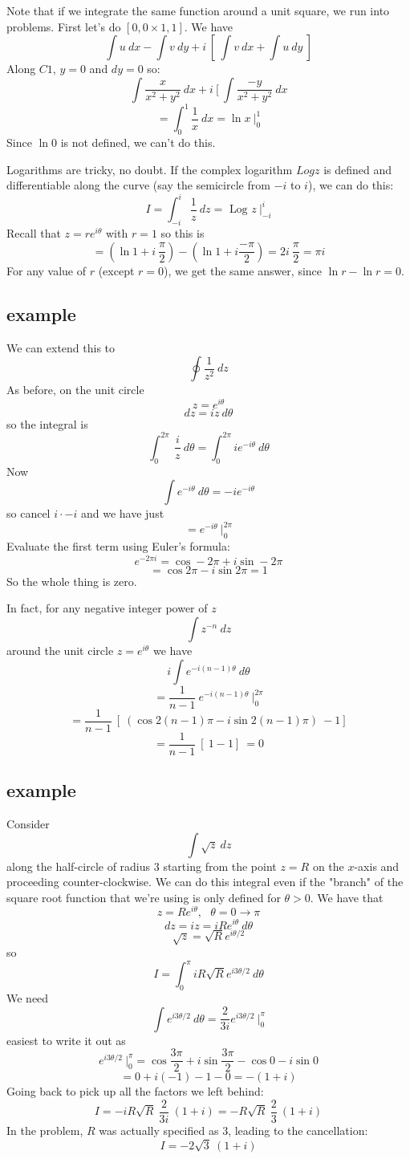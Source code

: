\documentclass[11pt, oneside]{article}   	%
\begin{document}
Note that if we integrate the same function around a unit square, we run into problems.  First let's  do $[0,0 \times 1,1]$.  We have
\[ \int u \ dx - \int v \ dy + i \ [ \ \int v \ dx + \int u \ dy \ ]  \]
Along $C1$, $y = 0$ and $dy = 0$ so:
\[ \int \frac{x}{x^2 + y^2} \ dx + i \ [ \ \int \frac{-y}{x^2 + y^2} \ dx \]
\[ = \int_0^1 \frac{1}{x} \ dx = \ln x \ \bigg |_0^1 \]
Since $\ln 0$ is not defined, we can't do this.

Logarithms are tricky, no doubt.  If the complex logarithm $Log z$ is defined and differentiable along the curve (say the semicircle from $-i$ to $i$), we can do this:
\[ I = \int_{-i}^i \frac{1}{z} \ dz = \text{ Log } z \ \bigg |_{-i}^i  \]
Recall that $z = re^{i\theta}$ with $r=1$ so this is
\[ = (\ln 1 + i \ \frac{\pi}{2} ) - (\ln 1 + i \frac{-\pi}{2} ) = 2i \ \frac{\pi}{2} = \pi i \]
For any value of $r$ (except $r=0$), we get the same answer, since $\ln r - \ln r = 0$.

\subsection*{example}
We can extend this to 
\[ \oint \frac{1}{z^2} \ dz \]
As before, on the unit circle
\[ z = e^{i\theta} \]
\[ dz = i z \ d \theta \]
so the integral is
\[ \int_0^{2 \pi} \ \frac{i}{z} \ d \theta =  \int_0^{2 \pi} i e^{-i\theta} \ d \theta \]
Now
\[ \int e^{-i\theta} \ d \theta = -i e^{-i\theta} \]
so cancel $i \cdot -i$ and we have just
\[ = e^{-i\theta} \ \bigg |_0^{2 \pi}  \]
Evaluate the first term using Euler's formula:
\[ e^{-2\pi i} = \cos -2 \pi + i \sin -2 \pi \]
\[ = \cos 2 \pi - i \sin 2 \pi = 1 \]
So the whole thing is zero.

In fact, for any negative integer power of $z$
\[ \int z^{-n} \ dz \]
around the unit circle $z=e^{i\theta}$ we have
\[ i \int e^{-i(n-1)\theta} \ d \theta \]
\[ = \frac{1}{n-1} \ e^{-i(n-1)\theta} \ \bigg |_0^{2 \pi}  \]
\[ = \frac{1}{n-1} \ [ \ (\cos 2 (n-1) \pi - i \sin 2 (n-1) \pi ) \ - 1 ]   \]
\[ = \frac{1}{n-1} \ [ \ 1  - 1 ] \ = 0  \]

\subsection*{example}
Consider
\[ \int \sqrt{z} \ dz \]
along the half-circle of radius $3$ starting from the point $z = R$ on the $x$-axis and proceeding counter-clockwise.
We can do this integral even if the "branch" of the square root function that we're using is only defined for $\theta > 0$.  We have that 
\[ z = Re^{i\theta}, \ \ \ \theta = 0 \rightarrow \pi \]
\[ dz = iz = iRe^{i\theta} \ d \theta \]
\[ \sqrt{z} = \sqrt{R} e^{i\theta/2} \]
so
\[ I = \int_0^{\pi} iR \sqrt{R} e^{i3\theta/2} \ d \theta \]
We need
\[ \int e^{i3\theta/2} \ d \theta = \frac{2}{3i} e^{i3\theta/2} \ \bigg |_0^{\pi} \]
easiest to write it out as
\[ e^{i3\theta/2} \ \bigg |_0^{\pi} = \cos \frac{3\pi}{2} + i \sin  \frac{3\pi}{2} - \cos 0 - i \sin 0 \]
\[ = 0 + i(-1) - 1 - 0 = -(1+i) \]
Going back to pick up all the factors we left behind:
\[ I = -iR \sqrt{R} \ \frac{2}{3i} \ (1+i) = -R \sqrt{R} \ \frac{2}{3} \ (1+i) \]
In the problem, $R$ was actually specified as $3$, leading to the cancellation:
\[ I = - 2 \sqrt{3} \ (1+i) \]
\end{document}

